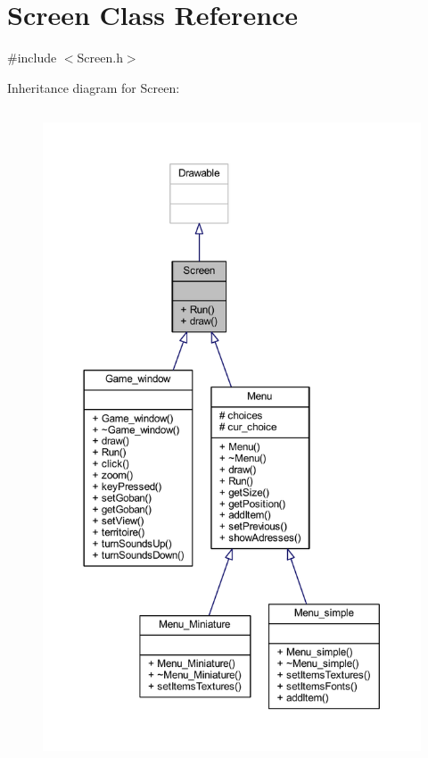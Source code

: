 \hypertarget{class_screen}{}\section{Screen Class Reference}
\label{class_screen}


{\ttfamily \#include $<$Screen.\+h$>$}



Inheritance diagram for Screen\+:
\nopagebreak
\begin{figure}[H]
\begin{center}
\leavevmode
\includegraphics[height=550pt]{class_screen__inherit__graph}
\end{center}
\end{figure}


